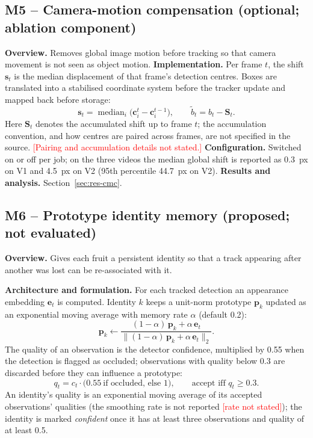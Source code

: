 \documentclass[11pt,a4paper]{article}
\newcommand{\todo}[1]{\textcolor{red}{[#1]}}
\begin{document}
\subsection{M5 -- Camera-motion compensation (optional; ablation component)}
\textbf{Overview.} Removes global image motion before tracking so that camera movement is not seen as object motion. \textbf{Implementation.} Per frame $t$, the shift $\mathbf{s}_t$ is the median displacement of that frame's detection centres. Boxes are translated into a stabilised coordinate system before the tracker update and mapped back before storage:
\begin{equation}
\mathbf{s}_t=\operatorname{median}_i\bigl(\mathbf{c}^{t}_i-\mathbf{c}^{t-1}_i\bigr),\qquad \tilde{b}_t=b_t-\mathbf{S}_t .\label{eq:cmc}
\end{equation}
Here $\mathbf{S}_t$ denotes the accumulated shift up to frame $t$; the accumulation convention, and how centres are paired across frames, are not specified in the source. \todo{Pairing and accumulation details not stated.} \textbf{Configuration.} Switched on or off per job; on the three videos the median global shift is reported as 0.3~px on V1 and 4.5~px on V2 (95th percentile 44.7~px on V2). \textbf{Results and analysis.} Section~\ref{sec:res-cmc}.

\subsection{M6 -- Prototype identity memory (proposed; not evaluated)}
\textbf{Overview.} Gives each fruit a persistent identity so that a track appearing after another was lost can be re-associated with it.

\textbf{Architecture and formulation.} For each tracked detection an appearance embedding $\mathbf{e}_t$ is computed. Identity $k$ keeps a unit-norm prototype $\mathbf{p}_k$ updated as an exponential moving average with memory rate $\alpha$ (default 0.2):
\begin{equation}
\mathbf{p}_k\leftarrow\frac{(1-\alpha)\,\mathbf{p}_k+\alpha\,\mathbf{e}_t}{\lVert(1-\alpha)\,\mathbf{p}_k+\alpha\,\mathbf{e}_t\rVert_2}.\label{eq:proto}
\end{equation}
The quality of an observation is the detector confidence, multiplied by 0.55 when the detection is flagged as occluded; observations with quality below 0.3 are discarded before they can influence a prototype:
\begin{equation}
q_t=c_t\cdot\bigl(0.55\ \text{if occluded, else }1\bigr),\qquad \text{accept iff }q_t\ge0.3 .\label{eq:quality}
\end{equation}
An identity's quality is an exponential moving average of its accepted observations' qualities (the smoothing rate is not reported \todo{rate not stated}); the identity is marked \emph{confident} once it has at least three observations and quality of at least 0.5.
\end{document}
